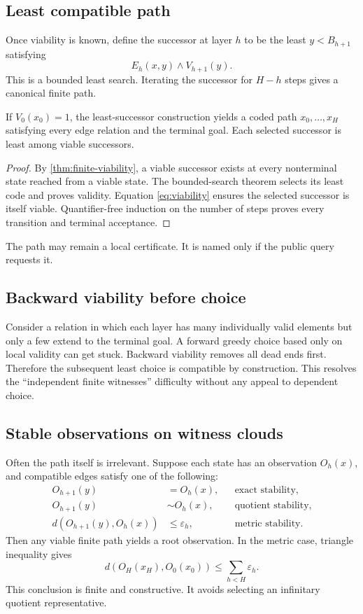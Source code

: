 \subsection{Least compatible path}

Once viability is known, define the successor at layer \(h\) to be the least
\(y<B_{h+1}\) satisfying
\[
  E_h(x,y)\wedge V_{h+1}(y).
\]
This is a bounded least search.  Iterating the successor for \(H-h\) steps
gives a canonical finite path.

\begin{theorem}
\label{thm:least-path}
If \(V_0(x_0)=1\), the least-successor construction yields a coded path
\(x_0,\ldots,x_H\) satisfying every edge relation and the terminal goal.
Each selected successor is least among viable successors.
\end{theorem}

\begin{proof}
By \cref{thm:finite-viability}, a viable successor exists at every nonterminal
state reached from a viable state.  The bounded-search theorem selects its
least code and proves validity.  Equation \eqref{eq:viability} ensures the
selected successor is itself viable.  Quantifier-free induction on the number
of steps proves every transition and terminal acceptance.
\end{proof}

The path may remain a local certificate.  It is named only if the public query
requests it.

\subsection{Backward viability before choice}

Consider a relation in which each layer has many individually valid elements
but only a few extend to the terminal goal.  A forward greedy choice based only
on local validity can get stuck.  Backward viability removes all dead ends
first.  Therefore the subsequent least choice is compatible by construction.
This resolves the ``independent finite witnesses'' difficulty without any
appeal to dependent choice.

\subsection{Stable observations on witness clouds}

Often the path itself is irrelevant.  Suppose each state has an observation
\(O_h(x)\), and compatible edges satisfy one of the following:
\begin{align*}
  O_{h+1}(y)&=O_h(x), &&\text{exact stability},\\
  O_{h+1}(y)&\sim O_h(x), &&\text{quotient stability},\\
  d(O_{h+1}(y),O_h(x))&\le\varepsilon_h,
     &&\text{metric stability}.
\end{align*}
Then any viable finite path yields a root observation.  In the metric case,
triangle inequality gives
\[
  d(O_H(x_H),O_0(x_0))
  \le \sum_{h<H}\varepsilon_h.
\]
This conclusion is finite and constructive.  It avoids selecting an
infinitary quotient representative.

